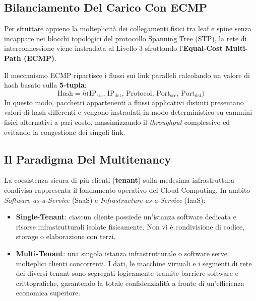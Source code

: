 \documentclass[11pt, a4paper]{article}
\begin{document}
\subsection{Bilanciamento Del Carico Con ECMP}
Per sfruttare appieno la molteplicità dei collegamenti fisici tra leaf e spine senza incappare nei blocchi topologici del protocollo Spanning Tree (STP), la rete di interconnessione viene instradata al Livello 3 sfruttando l'\textbf{Equal-Cost Multi-Path (ECMP)}.


Il meccanismo ECMP ripartisce i flussi sui link paralleli calcolando un valore di hash basato sulla \textbf{5-tupla}:
\[
\text{Hash} = h\Big(\text{IP}_{\text{src}},\, \text{IP}_{\text{dst}},\, \text{Protocol},\, \text{Port}_{\text{src}},\, \text{Port}_{\text{dst}}\Big)
\]
In questo modo, pacchetti appartenenti a flussi applicativi distinti presentano valori di hash differenti e vengono instradati in modo deterministico su cammini fisici alternativi a pari costo, massimizzando il \emph{throughput} complessivo ed evitando la congestione dei singoli link.

\subsection{Il Paradigma Del Multitenancy}
La coesistenza sicura di più clienti (\textbf{tenant}) sulla medesima infrastruttura condivisa rappresenta il fondamento operativo del Cloud Computing. In ambito \emph{Software-as-a-Service} (SaaS) e \emph{Infrastructure-as-a-Service} (IaaS):
\begin{itemize}[noitemsep]
    \item \textbf{Single-Tenant}: ciascun cliente possiede un'istanza software dedicata e risorse infrastrutturali isolate fisicamente. Non vi è condivisione di codice, storage o elaborazione con terzi.
    \item \textbf{Multi-Tenant}: una singola istanza infrastrutturale o software serve molteplici clienti concorrenti. I dati, le macchine virtuali e i segmenti di rete dei diversi tenant sono segregati logicamente tramite barriere software e crittografiche, garantendo la totale confidenzialità a fronte di un'efficienza economica superiore.
\end{itemize}

\end{document}
